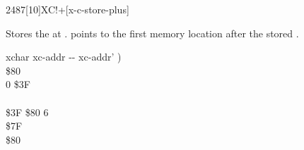 \pagebreak
\begin{worddef}{2487}[10]{XC!+}[x-c-store-plus]%
\item {}

	Stores the  at .  
	points to the first memory location after the stored .

	\begin{implement} %
	\word{:}   xchar xc-addr -{}- xc-addr' ) \\
	\tab {} \$80          \\
	\tab {} 0  \$3F \\
	\tab {}    \\
	\tab[2]    \$3F  \$80   6   \\
	\tab {} \$7F     \\
	\tab {}  \$80         \\
	\word{;}
	\end{implement}
\end{worddef}

